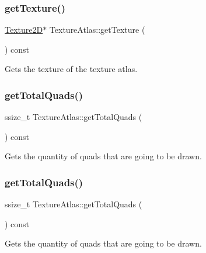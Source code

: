 \subsubsection{\texorpdfstring{get\+Texture()}{getTexture()}\hspace{0.1cm}{\footnotesize\ttfamily [2/2]}}
{\footnotesize\ttfamily \hyperlink{classTexture2D}{Texture2D}$\ast$ Texture\+Atlas\+::get\+Texture (\begin{DoxyParamCaption}{ }\end{DoxyParamCaption}) const}

Gets the texture of the texture atlas. \mbox{\label{classTextureAtlas_a4fca29377f79ca2092e36ddd42e31313}} 
\subsubsection{\texorpdfstring{get\+Total\+Quads()}{getTotalQuads()}\hspace{0.1cm}{\footnotesize\ttfamily [1/2]}}
{\footnotesize\ttfamily ssize\+\_\+t Texture\+Atlas\+::get\+Total\+Quads (\begin{DoxyParamCaption}{ }\end{DoxyParamCaption}) const}

Gets the quantity of quads that are going to be drawn. \mbox{\label{classTextureAtlas_a4fca29377f79ca2092e36ddd42e31313}} 
\subsubsection{\texorpdfstring{get\+Total\+Quads()}{getTotalQuads()}\hspace{0.1cm}{\footnotesize\ttfamily [2/2]}}
{\footnotesize\ttfamily ssize\+\_\+t Texture\+Atlas\+::get\+Total\+Quads (\begin{DoxyParamCaption}{ }\end{DoxyParamCaption}) const}

Gets the quantity of quads that are going to be drawn. \mbox{\label{classTextureAtlas_a69818ba2fc5488effec077ff3a3a506c}} 

